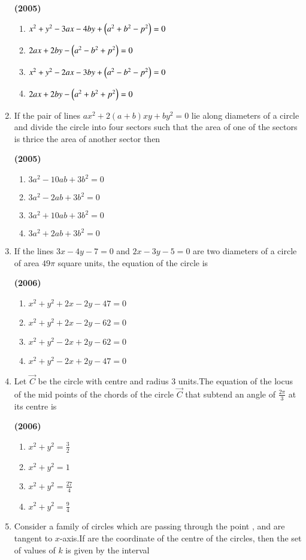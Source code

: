 \documentclass[journal,12pt,twocolumn]{IEEEtran}
\theoremstyle{remark}
\begin{document}
\begin{enumerate}[start=6]
\hfill{\textbf{(2005)}}

\begin{enumerate}[label=(\alph*)]
\item $x^2+y^2-3ax-4by+\left(a^2+b^2-p^2\right)=0$
\item $2ax+2by-\left(a^2-b^2+p^2\right)=0$
\item $x^2+y^2-2ax-3by+\left(a^2-b^2-p^2\right)=0$
\item $2ax+2by-\left(a^2+b^2+p^2\right)=0$
\end{enumerate}
\item If the pair of lines $ax^2+2(a+b)xy+by^2=0$ lie along diameters of a circle and divide the circle into four sectors such that the area of one of the sectors is thrice the area of another sector then

\hfill{\textbf{(2005)}}

\begin{enumerate}[label=(\alph*)]
\item $3a^2-10ab+3b^2=0$
\item $3a^2-2ab+3b^2=0$
\item $3a^2+10ab+3b^2=0$
\item $3a^2+2ab+3b^2=0$
\end{enumerate}
\item If the lines $3x-4y-7=0$ and $2x-3y-5=0$ are two diameters of a circle of area $49\pi$ square units, the equation of the circle is 

\hfill{\textbf{(2006)}}

\begin{enumerate}[label=(\alph*)]
\item $x^2+y^2+2x-2y-47=0$
\item $x^2+y^2+2x-2y-62=0$
\item $x^2+y^2-2x+2y-62=0$
\item $x^2+y^2-2x+2y-47=0$
\end{enumerate}
\item Let $\vec{C}$ be the circle with centre  and radius 3 units.The equation of the locus of the mid points of the chords of the circle $\vec{C}$ that subtend an angle of $\frac{2\pi}{3}$ at its centre is

\hfill{\textbf{(2006)}}

\begin{multicols}{2}
\begin{enumerate}[label=(\alph*)]
\item $x^2+y^2=\frac{3}{2}$
\item $x^2+y^2=1$
\item $x^2+y^2=\frac{27}{4}$
\item $x^2+y^2=\frac{9}{4}$
\end{enumerate}
\end{multicols}
\item Consider a family of circles which are passing through the point , and are tangent to $x$-axis.If  are the coordinate of the centre of the circles, then the set of values of $k$ is given by the interval


\end{enumerate}
\end{document}
